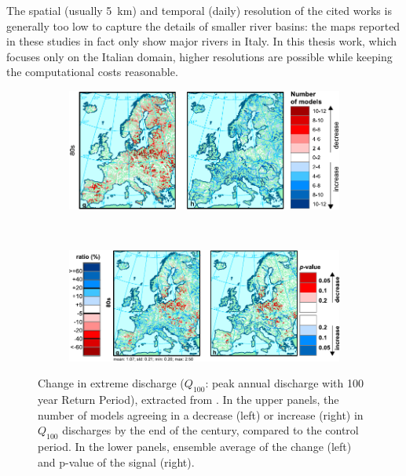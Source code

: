 The spatial (usually \SI{5}{\kilo\meter}) and temporal (daily) resolution of the cited works is generally too low to capture the details of smaller river basins: the maps reported in these studies in fact only show major rivers in Italy. In this thesis work, which focuses only on the Italian domain, higher resolutions are possible while keeping the computational costs reasonable.

\begin{figure}
    \centering
    \begin{subfigure}{\textwidth}
        \caption{}\label{fig:rojas_change/a}
        \includegraphics[width=\textwidth]{figures/ita_flood/rojas2_crop}
    \end{subfigure}\\
    \begin{subfigure}{\textwidth}
        \caption{}\label{fig:rojas_change/b}
        \includegraphics[width=\textwidth]{figures/ita_flood/rojas3_crop}
    \end{subfigure}
    \decoRule
    \caption[Extreme discharge change in Europe according to \citet{Rojas2012}]{
    Change in extreme discharge ($Q_{100}$: peak annual discharge with 100 year Return Period), extracted from \citet[][figures 5 and 6]{Rojas2012}. In the upper panels, the number of models agreeing in a decrease (left) or increase (right) in $Q_{100}$ discharges by the end of the century, compared to the control period. In the lower panels, ensemble average of the change (left) and p-value of the signal (right).
} \label{fig:rojas_change}
\end{figure}

